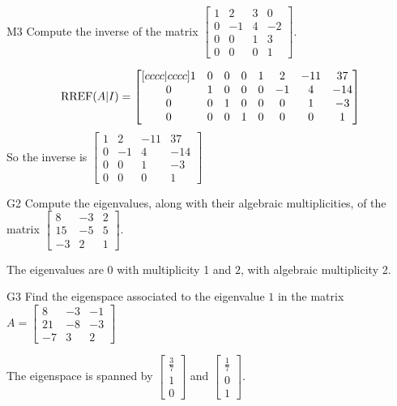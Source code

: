 \documentclass{sbgLAquiz}
\begin{document}
\begin{extract}\newpage\end{extract}
\begin{problem}{M3}
Compute the inverse of the matrix $\begin{bmatrix} 1 & 2 & 3 & 0 \\ 0 & -1 & 4 & -2 \\ 0 & 0 & 1 & 3 \\ 0 & 0 & 0 & 1 \end{bmatrix}$.
\end{problem}
\begin{solution}
$$\operatorname{RREF}(A|I) = \begin{bmatrix}[cccc|cccc] 1 & 0 & 0 &0 & 1 & 2 & -11 & 37 \\ 0 & 1 & 0 & 0 & 0 & -1 & 4 & -14 \\ 0 & 0 & 1 & 0 & 0 & 0 & 1 & -3 \\ 0 & 0 & 0 & 1 & 0 & 0 & 0 & 1 \end{bmatrix}$$
So the inverse is $\begin{bmatrix}  1 & 2 & -11 & 37 \\ 0 & -1 & 4 & -14 \\  0 & 0 & 1 & -3 \\ 0 & 0 & 0 & 1 \end{bmatrix}$
\end{solution}


\begin{problem}{G2} 
Compute the eigenvalues, along with their algebraic multiplicities, of the matrix $ \begin{bmatrix} 8 & -3 & 2 \\ 15 & -5 & 5 \\ -3 & 2 & 1 \end{bmatrix}$.
\end{problem}
\begin{solution}
The eigenvalues are $0$ with multiplicity 1 and $2$, with algebraic multiplicity 2.
\end{solution}

\begin{extract}\newpage\end{extract}
\begin{problem}{G3}
Find the eigenspace associated to the eigenvalue $1$ in the matrix $A=\begin{bmatrix} 8 & -3 & -1 \\ 21 & -8 & -3 \\ -7 & 3  & 2 \end{bmatrix}$
\end{problem}
\begin{solution}
The eigenspace is spanned by $\begin{bmatrix} \frac{3}{7} \\ 1 \\ 0 \end{bmatrix}$ and $\begin{bmatrix}\frac{1}{7} \\ 0 \\ 1 \end{bmatrix}$.
\end{solution}
\end{document}

